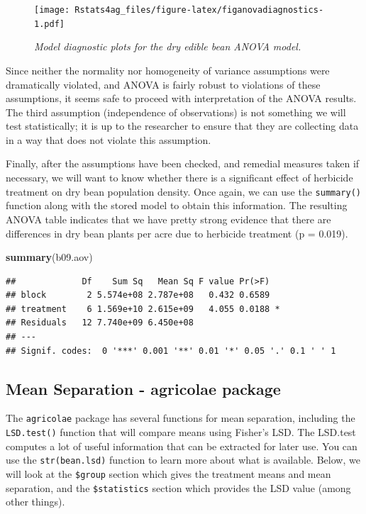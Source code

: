 \documentclass[letterpaper,]{book}
\newenvironment{Shaded}{\begin{snugshade}}{\end{snugshade}}
\newcommand{\KeywordTok}[1]{\textcolor[rgb]{0.13,0.29,0.53}{\textbf{#1}}}
\newcommand{\NormalTok}[1]{#1}
\begin{document}
\begin{figure}
\centering
\texttt{[image: Rstats4ag\_files/figure-latex/figanovadiagnostics-1.pdf]}
\caption{\label{fig:figanovadiagnostics}\emph{Model diagnostic plots for the dry edible bean ANOVA model.}}
\end{figure}

Since neither the normality nor homogeneity of variance assumptions were dramatically violated, and ANOVA is fairly robust to violations of these assumptions, it seems safe to proceed with interpretation of the ANOVA results. The third assumption (independence of observations) is not something we will test statistically; it is up to the researcher to ensure that they are collecting data in a way that does not violate this assumption.

Finally, after the assumptions have been checked, and remedial measures taken if necessary, we will want to know whether there is a significant effect of herbicide treatment on dry bean population density. Once again, we can use the \texttt{summary()} function along with the stored model to obtain this information. The resulting ANOVA table indicates that we have pretty strong evidence that there are differences in dry bean plants per acre due to herbicide treatment (p = 0.019).

\begin{Shaded}
\begin{Highlighting}[]
\KeywordTok{summary}\NormalTok{(b09.aov)}
\end{Highlighting}
\end{Shaded}

\begin{verbatim}
##             Df    Sum Sq   Mean Sq F value Pr(>F)  
## block        2 5.574e+08 2.787e+08   0.432 0.6589  
## treatment    6 1.569e+10 2.615e+09   4.055 0.0188 *
## Residuals   12 7.740e+09 6.450e+08                 
## ---
## Signif. codes:  0 '***' 0.001 '**' 0.01 '*' 0.05 '.' 0.1 ' ' 1
\end{verbatim}

\hypertarget{mean-separation---agricolae-package}{%
\subsection{Mean Separation - agricolae package}\label{mean-separation---agricolae-package}}

The \texttt{agricolae} package has several functions for mean separation, including the \texttt{LSD.test()} function that will compare means using Fisher's LSD. The LSD.test computes a lot of useful information that can be extracted for later use. You can use the \texttt{str(bean.lsd)} function to learn more about what is available. Below, we will look at the \texttt{\$group} section which gives the treatment means and mean separation, and the \texttt{\$statistics} section which provides the LSD value (among other things).
\end{document}
